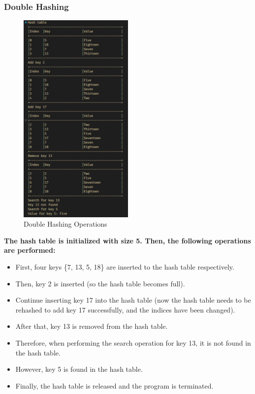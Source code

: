 \subsubsection*{Double Hashing}
\begin{figure}[H]
	\centering
	\includegraphics[width=0.5\textwidth, height=0.65\textheight]{images/double_hash/main.png}
	\caption{Double Hashing Operations}
\end{figure}
\textbf{The hash table is initialized with size 5. Then, the following operations are performed:}
\begin{itemize}
	\item First, four keys \{7, 13, 5, 18\} are inserted to the hash table respectively.
	\item Then, key 2 is inserted (so the hash table becomes full).
	\item Continue inserting key 17 into the hash table (now the hash table needs to be rehashed to add key 17 successfully, and the indices have been changed).
	\item After that, key 13 is removed from the hash table.
	\item Therefore, when performing the search operation for key 13, it is not found in the hash table.
	\item However, key 5 is found in the hash table.
	\item Finally, the hash table is released and the program is terminated.
\end{itemize}


